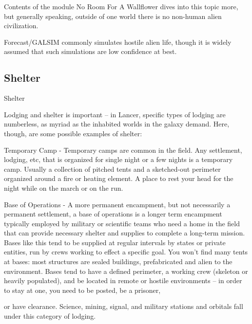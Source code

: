 Contents of the module No Room For A Wallflower dives into this topic more, but generally  
speaking, outside of one world there is no non-human alien civilization. 
 

Forecast/GALSIM commonly simulates hostile alien life, though it is widely assumed that such  
simulations are low confidence at best. 
 
\subsection{Shelter}
Shelter  

Lodging and shelter is important -- in Lancer, specific types of lodging are numberless, as myriad  
as the inhabited worlds in the galaxy demand. Here, though, are some possible examples of  
shelter: 
 

Temporary Camp - Temporary camps are common in the field. Any settlement, lodging, etc, that  
is organized for single night or a few nights is a temporary camp. Usually a collection of pitched  
tents and a sketched-out perimeter organized around a fire or heating element. A place to rest  
your head for the night while on the march or on the run.  
 

Base of Operations - A more permanent encampment, but not necessarily a permanent  
settlement, a base of operations is a longer term encampment typically employed by military or  
scientific teams who need a home in the field that can provide necessary shelter and supplies to  
complete a long-term mission. Bases like this tend to be supplied at regular intervals by states or  
private entities, run by crews working to effect a specific goal. You won’t find many tents at  
bases: most structures are sealed buildings, prefabricated and alien to the environment. Bases  
tend to have a defined perimeter, a working crew (skeleton or heavily populated), and be located  
in remote or hostile environments -- in order to stay at one, you need to be posted, be a prisoner,  

                                                                                                              


or have clearance. Science, mining, signal, and military stations and orbitals fall under this  
category of lodging.   
 

